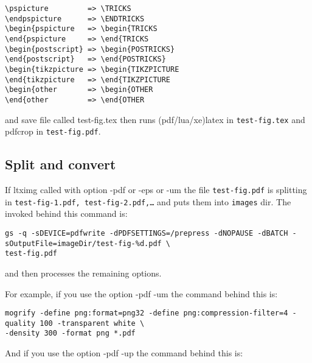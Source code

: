 \documentclass[11pt]{article}
\begin{document}
\begin{enumerate}
\begin{lstlisting}
\pspicture         => \TRICKS
\endpspicture      => \ENDTRICKS
\begin{pspicture   => \begin{TRICKS
\end{pspicture     => \end{TRICKS
\begin{postscript} => \begin{POSTRICKS}
\end{postscript}   => \end{POSTRICKS}
\begin{tikzpicture => \begin{TIKZPICTURE
\end{tikzpicture   => \end{TIKZPICTURE
\begin{other       => \begin{OTHER
\end{other         => \end{OTHER
\end{lstlisting}

and save file called test-fig.tex then runs (pdf/lua/xe)latex in \texttt{test-fig.tex} and \textsf{pdfcrop} in 
\texttt{test-fig.pdf}.
\end{enumerate}
\subsection{Split and convert}
If \textsf{ltximg} called with option \textsf{-pdf} or \textsf{-eps} or \textsf{-um} the file \texttt{test-fig.pdf}
is splitting in \texttt{test-fig-1.pdf, test-fig-2.pdf,\ldots} and puts them into \texttt{images} dir. The invoked behind this command is:

\begin{lstlisting}
gs -q -sDEVICE=pdfwrite -dPDFSETTINGS=/prepress -dNOPAUSE -dBATCH -sOutputFile=imageDir/test-fig-%d.pdf \
test-fig.pdf
\end{lstlisting}
and then processes the remaining options.

For example, if you use the option \textsf{-pdf -um} the command behind this is:

\begin{lstlisting}
mogrify -define png:format=png32 -define png:compression-filter=4 -quality 100 -transparent white \
-density 300 -format png *.pdf
\end{lstlisting}

And if you use the option \textsf{-pdf -up} the command behind this is:
\end{document}
